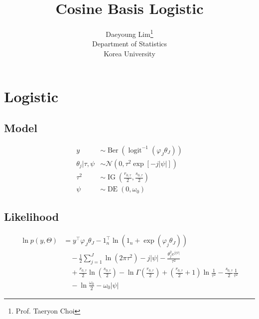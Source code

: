 \documentclass[11pt]{article}
\newcommand{\opn}{\operatorname}
\begin{document}
\nocite{*}

\title{Cosine Basis Logistic}

\author{Daeyoung Lim\thanks{Prof. Taeryon Choi} \\
Department of Statistics \\
Korea University}

\maketitle
\section{Logistic}
\subsection{Model}
  \begin{align*}
    y &\sim \opn{Ber}\left(\opn{logit}^{-1}\left(\varphi_{J}\theta_{J}\right)\right)\\
    \theta_{j}| \tau, \psi &\sim \mathcal{N}\left(0, \tau^{2}\exp\left[-j\left|\psi\right|\right]\right)\\
    \tau^{2} &\sim \opn{IG}\left(\frac{r_{0,\tau}}{2}, \frac{s_{0,\tau}}{2}\right)\\
    \psi &\sim \opn{DE}\left(0,\omega_{0}\right)
  \end{align*}
\subsection{Likelihood}
  \begin{align*}
    \ln p\left(y, \Theta\right) &= y^{\top}\varphi_{J}\theta_{J} - 1_{n}^{\top}\ln \left(1_{n} + \exp\left(\varphi_{j}\theta_{J}\right)\right)\\
    &\quad -\frac{1}{2}\sum_{j=1}^{J}\ln\left(2\pi\tau^{2}\right) - j\left|\psi\right| - \frac{\theta_{j}^{2}e^{j\left|\psi\right|}}{\tau^{2}}\\
    &\quad +\frac{r_{0,\tau}}{2}\ln\left(\frac{s_{0,\tau}}{2}\right) - \ln\Gamma\left(\frac{r_{0,\tau}}{2}\right) + \left(\frac{r_{0,\tau}}{2}+1\right)\ln\frac{1}{\tau^{2}} -\frac{s_{0,\tau}}{2}\frac{1}{\tau^{2}}\\
    &\quad -\ln\frac{\omega_{0}}{2} -\omega_{0}\left|\psi\right|
  \end{align*}
\end{document}
